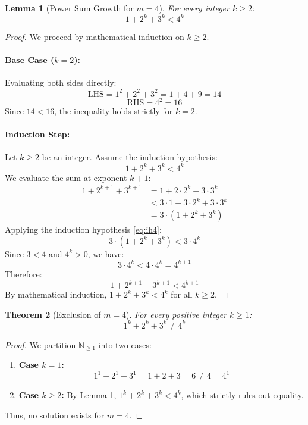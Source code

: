 \documentclass[11pt,a4paper]{article}
\newtheorem{theorem}{Theorem}[section]
\newtheorem{lemma}[theorem]{Lemma}
\theoremstyle{definition}
\begin{document}
\begin{lemma}[Power Sum Growth for $m = 4$]\label{lem:m4_growth}
For every integer $k \ge 2$:
\begin{equation}\label{eq:m4_ineq}
1 + 2^k + 3^k < 4^k
\end{equation}
\end{lemma}

\begin{proof}
We proceed by mathematical induction on $k \ge 2$.

\paragraph{Base Case ($k = 2$):}
Evaluating both sides directly:
\[ \text{LHS} = 1^2 + 2^2 + 3^2 = 1 + 4 + 9 = 14 \]
\[ \text{RHS} = 4^2 = 16 \]
Since $14 < 16$, the inequality holds strictly for $k = 2$.

\paragraph{Induction Step:}
Let $k \ge 2$ be an integer. Assume the induction hypothesis:
\begin{equation}\label{eq:ih4}
1 + 2^k + 3^k < 4^k
\end{equation}
We evaluate the sum at exponent $k+1$:
\begin{align*}
1 + 2^{k+1} + 3^{k+1} &= 1 + 2 \cdot 2^k + 3 \cdot 3^k \\
&< 3 \cdot 1 + 3 \cdot 2^k + 3 \cdot 3^k \\
&= 3 \cdot (1 + 2^k + 3^k)
\end{align*}
Applying the induction hypothesis \eqref{eq:ih4}:
\[ 3 \cdot (1 + 2^k + 3^k) < 3 \cdot 4^k \]
Since $3 < 4$ and $4^k > 0$, we have:
\[ 3 \cdot 4^k < 4 \cdot 4^k = 4^{k+1} \]
Therefore:
\[ 1 + 2^{k+1} + 3^{k+1} < 4^{k+1} \]
By mathematical induction, $1 + 2^k + 3^k < 4^k$ for all $k \ge 2$.
\end{proof}

\begin{theorem}[Exclusion of $m = 4$]\label{thm:m4_exclusion}
For every positive integer $k \ge 1$:
\begin{equation}\label{eq:m4_no_sol}
1^k + 2^k + 3^k \ne 4^k
\end{equation}
\end{theorem}

\begin{proof}
We partition $\mathbb{N}_{\ge 1}$ into two cases:
\begin{enumerate}
    \item \textbf{Case $k = 1$:}
    \[ 1^1 + 2^1 + 3^1 = 1 + 2 + 3 = 6 \ne 4 = 4^1 \]
    \item \textbf{Case $k \ge 2$:}
    By Lemma \ref{lem:m4_growth}, $1^k + 2^k + 3^k < 4^k$, which strictly rules out equality.
\end{enumerate}
Thus, no solution exists for $m = 4$.
\end{proof}
\end{document}
